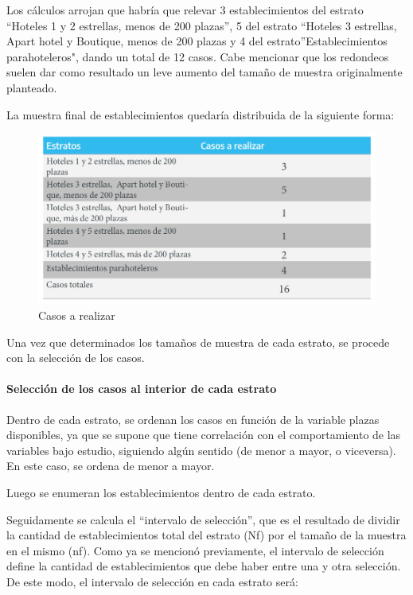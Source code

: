 \documentclass[
]{book}
\begin{document}
Los cálculos arrojan que habría que relevar 3 establecimientos del estrato ``Hoteles 1 y 2 estrellas, menos de 200 plazas'', 5 del estrato ``Hoteles 3 estrellas, Apart hotel y Boutique, menos de 200 plazas y 4 del estrato''Establecimientos parahoteleros", dando un total de 12 casos. Cabe mencionar que los redondeos suelen dar como resultado un leve aumento del tamaño de muestra originalmente planteado.

La muestra final de establecimientos quedaría distribuida de la siguiente forma:

\begin{figure}

{\centering \includegraphics[width=1\linewidth]{imagenes/tabla_2C} 

}

\caption{Casos a realizar}\label{fig:casos-a-realizar}
\end{figure}

Una vez que determinados los tamaños de muestra de cada estrato, se procede con la selección de los casos.

\hypertarget{selecciuxf3n-de-los-casos-al-interior-de-cada-estrato}{%
\paragraph{Selección de los casos al interior de cada estrato}\label{selecciuxf3n-de-los-casos-al-interior-de-cada-estrato}}

Dentro de cada estrato, se ordenan los casos en función de la variable plazas disponibles, ya que se supone que tiene correlación con el comportamiento de las variables bajo estudio, siguiendo algún sentido (de menor a mayor, o viceversa). En este caso, se ordena de menor a mayor.

Luego se enumeran los establecimientos dentro de cada estrato.

Seguidamente se calcula el ``intervalo de selección'', que es el resultado de dividir la cantidad de establecimientos total del estrato (Nf) por el tamaño de la muestra en el mismo (nf). Como ya se mencionó previamente, el intervalo de selección define la cantidad de establecimientos que debe haber entre una y otra selección. De este modo, el intervalo de selección en cada estrato será:
\end{document}
